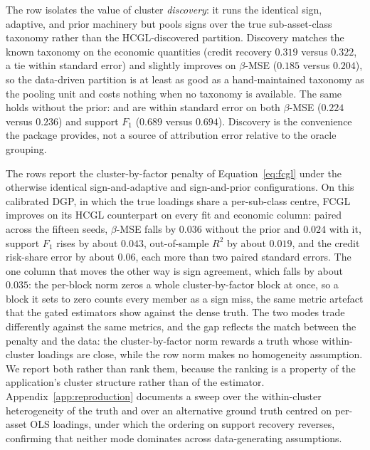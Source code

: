 \documentclass[article]{jss}
\begin{document}
The  row isolates the value of cluster
\emph{discovery}: it runs the identical sign, adaptive, and prior
machinery but pools signs over the true sub-asset-class taxonomy rather
than the HCGL-discovered partition. Discovery matches the known
taxonomy on the economic quantities (credit recovery $0.319$ versus
$0.322$, a tie within standard error) and slightly improves on
$\beta$-MSE ($0.185$ versus $0.204$), so the data-driven partition is at
least as good as a hand-maintained taxonomy as the pooling unit and
costs nothing when no taxonomy is available. The same holds without the
prior:  and  are within
standard error on both $\beta$-MSE ($0.224$ versus $0.236$) and support
$F_1$ ($0.689$ versus $0.694$). Discovery is the convenience the package
provides, not a source of attribution error relative to the oracle
grouping.

The  rows report the cluster-by-factor penalty of
Equation~\ref{eq:fcgl} under the otherwise identical sign-and-adaptive
and sign-and-prior configurations. On this calibrated DGP, in which the
true loadings share a per-sub-class centre, FCGL improves on its HCGL
counterpart on every fit and economic column: paired across the fifteen
seeds, $\beta$-MSE falls by $0.036$ without the prior and $0.024$ with
it, support $F_1$ rises by about $0.043$, out-of-sample $R^2$ by about
$0.019$, and the credit risk-share error by about $0.06$, each more than
two paired standard errors. The one column that moves the other way is
sign agreement, which falls by about $0.035$: the per-block norm zeros a
whole cluster-by-factor block at once, so a block it sets to zero counts
every member as a sign miss, the same metric artefact that the gated
estimators show against the dense truth. The two modes trade
differently against the same metrics, and the gap reflects the match
between the penalty and the data: the cluster-by-factor norm rewards a
truth whose within-cluster loadings are close, while the row norm makes
no homogeneity assumption. We report both rather than rank them, because
the ranking is a property of the application's cluster structure rather
than of the estimator. Appendix~\ref{app:reproduction} documents a sweep
over the within-cluster heterogeneity of the truth and over an
alternative ground truth centred on per-asset OLS loadings, under which
the ordering on support recovery reverses, confirming that neither mode
dominates across data-generating assumptions.
\end{document}
